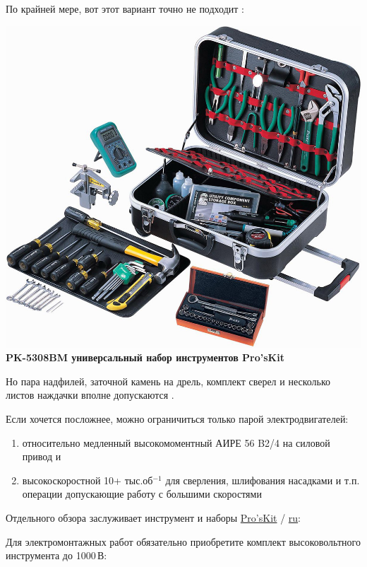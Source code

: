{По крайней мере, вот этот вариант точно не подходит \smiley:

\noindent\includegraphics[width=\columnwidth]{00/fig/PK5308BM.jpg}
\textbf{PK-5308BM универсальный набор инструментов Pro'sKit}

Но пара надфилей, заточной камень на дрель, комплект сверел и несколько листов
наждачки вполне допускаются \smiley.

Если хочется посложнее, можно ограничиться только парой электродвигателей:
\begin{enumerate}
  \item
относительно медленный высокомоментный АИРЕ 56 B2/4 на силовой привод и
\item
высокоскоростной 10+ тыс.об$^{-1}$ для сверления, шлифования насадками и т.п.
операции допускающие работу с большими скоростями

\end{enumerate}


Отдельного обзора заслуживает инструмент и наборы
\href{http://www.proskit.com/}{Pro'sKit}
 / \href{http://www.proskit.msk.ru/index.html}{ru}:


Для электромонтажных работ обязательно приобретите комплект
высоковольтного инструмента до 1000\,В:

}
